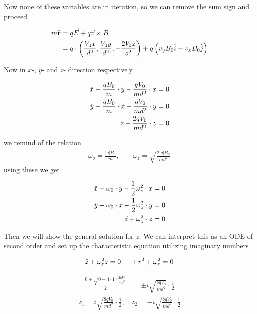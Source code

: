 \documentclass[english,notitlepage]{revtex4-1}  %
\begin{document}
Now none of these variables are in iteration, so we can remove the sum sign and proceed

\begin{align}
    m \bf{\Ddot{r}} &= q \Vec{E} + q \Vec{v} \times \Vec{B}
    \\
    &= q \cdot \left(\frac{V_0 x}{d^2}, \frac{V_0 y}{d^2}, -\frac{2 V_0 z}{d^2} \right) + q \left( v_y B_0 \hat{i} - v_x B_0 \hat{j} \right)
\end{align}

Now in $x$-, $y$- and $z$- direction respectively

\begin{align}
    \Ddot{x}- \frac{qB_0}{m}\cdot \Dot{y} - \frac{qV_0}{m d^2} \cdot x &= 0
    \\
    \Ddot{y}+ \frac{qB_0}{m} \cdot  \Dot{x} - \frac{qV_0}{m d^2} \cdot y &= 0
    \\
    \Ddot{z} + \frac{2 q V_0}{m d^2} \cdot z &= 0
\end{align}

we remind of the relation
\begin{align}
    \omega_o = \frac{|q| B_0}{m}, \qquad \omega_z = \sqrt{\frac{2 |q| B_0}{m d^2}}
\end{align}
using these we get

\begin{align}
    \Ddot{x}- \omega_0\cdot \Dot{y} - \frac{1}{2}\omega_z^2 \cdot x &= 0
    \\
    \Ddot{y} + \omega_0 \cdot  \Dot{x} - \frac{1}{2}\omega_z^2 \cdot y &= 0
    \\
    \Ddot{z} +  \omega_z^2 \cdot z &= 0
\end{align}

Then we will show the general solution for $z$. We can interpret this as an ODE of second order and set up the characteristic equation utilizing imaginary numbers

\begin{align}
    \Ddot{z} + \omega_z^2 z = 0 \quad \rightarrow r^2 + \omega_z^2 = 0
\end{align}

\begin{align}
    \frac{0 \pm \sqrt{0 - 4 \cdot 1 \cdot \frac{2aV_0}{md^2}}}{2} &= \pm i \sqrt{\frac{8 q V_0}{md^2}} \cdot \frac{1}{2}
\end{align}
\begin{align}
    z_1 = i \sqrt{\frac{8 q V_0}{md^2}} \cdot \frac{1}{2}, \quad z_2 = -i \sqrt{\frac{8 q V_0}{md^2}} \cdot \frac{1}{2}
\end{align}
\end{document}
